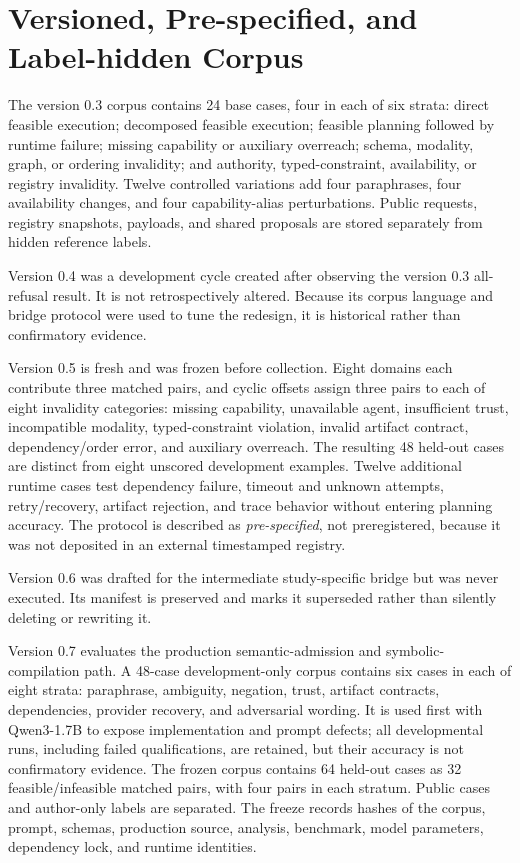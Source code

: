\section{Versioned, Pre-specified, and Label-hidden Corpus}

The version 0.3 corpus contains 24 base cases, four in each of six strata: direct feasible execution; decomposed feasible execution; feasible planning followed by runtime failure; missing capability or auxiliary overreach; schema, modality, graph, or ordering invalidity; and authority, typed-constraint, availability, or registry invalidity. Twelve controlled variations add four paraphrases, four availability changes, and four capability-alias perturbations. Public requests, registry snapshots, payloads, and shared proposals are stored separately from hidden reference labels.

Version 0.4 was a development cycle created after observing the version 0.3 all-refusal result. It is not retrospectively altered. Because its corpus language and bridge protocol were used to tune the redesign, it is historical rather than confirmatory evidence.

Version 0.5 is fresh and was frozen before collection. Eight domains each contribute three matched pairs, and cyclic offsets assign three pairs to each of eight invalidity categories: missing capability, unavailable agent, insufficient trust, incompatible modality, typed-constraint violation, invalid artifact contract, dependency/order error, and auxiliary overreach. The resulting 48 held-out cases are distinct from eight unscored development examples. Twelve additional runtime cases test dependency failure, timeout and unknown attempts, retry/recovery, artifact rejection, and trace behavior without entering planning accuracy. The protocol is described as \emph{pre-specified}, not preregistered, because it was not deposited in an external timestamped registry.

Version 0.6 was drafted for the intermediate study-specific bridge but was never executed. Its manifest is preserved and marks it superseded rather than silently deleting or rewriting it.

Version 0.7 evaluates the production semantic-admission and symbolic-compilation path. A 48-case development-only corpus contains six cases in each of eight strata: paraphrase, ambiguity, negation, trust, artifact contracts, dependencies, provider recovery, and adversarial wording. It is used first with Qwen3-1.7B to expose implementation and prompt defects; all developmental runs, including failed qualifications, are retained, but their accuracy is not confirmatory evidence. The frozen corpus contains 64 held-out cases as 32 feasible/infeasible matched pairs, with four pairs in each stratum. Public cases and author-only labels are separated. The freeze records hashes of the corpus, prompt, schemas, production source, analysis, benchmark, model parameters, dependency lock, and runtime identities.

